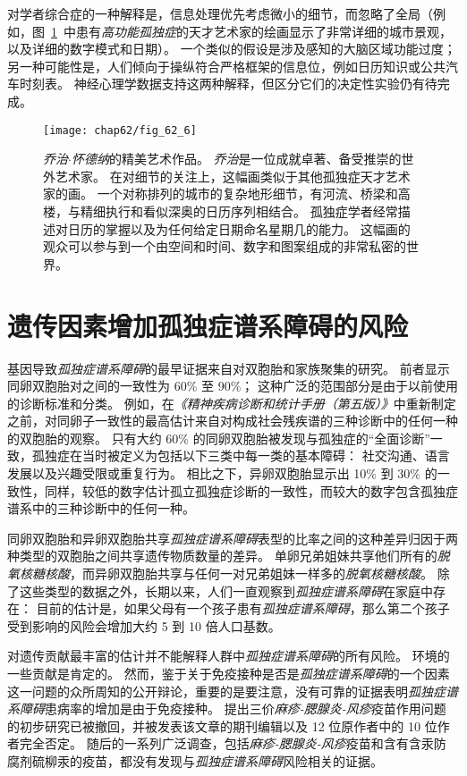 对学者综合症的一种解释是，信息处理优先考虑微小的细节，而忽略了全局（例如，图~\ref{fig:62_6}~中患有\textit{高功能孤独症}的天才艺术家的绘画显示了非常详细的城市景观，以及详细的数字模式和日期）。
一个类似的假设是涉及感知的大脑区域功能过度；
另一种可能性是，人们倾向于操纵符合严格框架的信息位，例如日历知识或公共汽车时刻表。
神经心理学数据支持这两种解释，但区分它们的决定性实验仍有待完成。


\begin{figure}[htbp]
	\centering
	\texttt{[image: chap62/fig\_62\_6]}
	\caption{\textit{乔治$\cdot$怀德纳}的精美艺术作品。
		\textit{乔治}是一位成就卓著、备受推崇的世外艺术家。
		在对细节的关注上，这幅画类似于其他孤独症天才艺术家的画。
		一个对称排列的城市的复杂地形细节，有河流、桥梁和高楼，与精细执行和看似深奥的日历序列相结合。
		孤独症学者经常描述对日历的掌握以及为任何给定日期命名星期几的能力。
		这幅画的观众可以参与到一个由空间和时间、数字和图案组成的非常私密的世界。}
	\label{fig:62_6}
\end{figure}



\section{遗传因素增加孤独症谱系障碍的风险}

基因导致\textit{孤独症谱系障碍}的最早证据来自对双胞胎和家族聚集的研究。
前者显示同卵双胞胎对之间的一致性为 60\% 至 90\%；
这种广泛的范围部分是由于以前使用的诊断标准和分类。
例如，在\textit{《精神疾病诊断和统计手册（第五版）》}中重新制定之前，对同卵子一致性的最高估计来自对构成社会残疾谱的三种诊断中的任何一种的双胞胎的观察。
只有大约 60\% 的同卵双胞胎被发现与孤独症的“全面诊断”一致，孤独症在当时被定义为包括以下三类中每一类的基本障碍：
社交沟通、语言发展以及兴趣受限或重复行为。
相比之下，异卵双胞胎显示出 10\% 到 30\% 的一致性，同样，较低的数字估计孤立孤独症诊断的一致性，而较大的数字包含孤独症谱系中的三种诊断中的任何一种。


同卵双胞胎和异卵双胞胎共享\textit{孤独症谱系障碍}表型的比率之间的这种差异归因于两种类型的双胞胎之间共享遗传物质数量的差异。
单卵兄弟姐妹共享他们所有的\textit{脱氧核糖核酸}，而异卵双胞胎共享与任何一对兄弟姐妹一样多的\textit{脱氧核糖核酸}。
除了这些类型的数据之外，长期以来，人们一直观察到\textit{孤独症谱系障碍}在家庭中存在：
目前的估计是，如果父母有一个孩子患有\textit{孤独症谱系障碍}，那么第二个孩子受到影响的风险会增加大约 5 到 10 倍人口基数。


对遗传贡献最丰富的估计并不能解释人群中\textit{孤独症谱系障碍}的所有风险。
环境的一些贡献是肯定的。
然而，鉴于关于免疫接种是否是\textit{孤独症谱系障碍}的一个因素这一问题的众所周知的公开辩论，重要的是要注意，没有可靠的证据表明\textit{孤独症谱系障碍}患病率的增加是由于免疫接种。
提出三价\textit{麻疹-腮腺炎-风疹}疫苗作用问题的初步研究已被撤回，并被发表该文章的期刊编辑以及 12 位原作者中的 10 位作者完全否定。
随后的一系列广泛调查，包括\textit{麻疹-腮腺炎-风疹}疫苗和含有含汞防腐剂硫柳汞的疫苗，都没有发现与\textit{孤独症谱系障碍}风险相关的证据。


